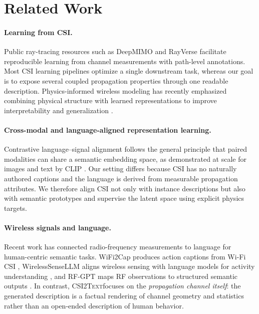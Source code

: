 \documentclass{article}
\newcommand{\model}{\textsc{CSI2Text}}
\begin{document}
\section{Related Work}

\paragraph{Learning from CSI.}
Public ray-tracing resources such as DeepMIMO \citep{alkhateeb2019deepmimo} and RayVerse \citep{rayverse2025} facilitate reproducible learning from channel measurements with path-level annotations.
Most CSI learning pipelines optimize a single downstream task, whereas our goal is to expose several coupled propagation properties through one readable description.
Physics-informed wireless modeling has recently emphasized combining physical structure with learned representations to improve interpretability and generalization \citep{zhu2024physicsinformed}.

\paragraph{Cross-modal and language-aligned representation learning.}
Contrastive language--signal alignment follows the general principle that paired modalities can share a semantic embedding space, as demonstrated at scale for images and text by CLIP \citep{radford2021clip}.
Our setting differs because CSI has no naturally authored captions and the language is derived from measurable propagation attributes.
We therefore align CSI not only with instance descriptions but also with semantic prototypes and supervise the latent space using explicit physics targets.

\paragraph{Wireless signals and language.}
Recent work has connected radio-frequency measurements to language for human-centric semantic tasks.
WiFi2Cap produces action captions from Wi-Fi CSI \citep{wei2026wifi2cap}, WirelessSenseLLM aligns wireless sensing with language models for activity understanding \citep{keya2026wirelesssensellm}, and RF-GPT maps RF observations to structured semantic outputs \citep{zou2026rfgpt}.
In contrast, \model focuses on the \emph{propagation channel itself}: the generated description is a factual rendering of channel geometry and statistics rather than an open-ended description of human behavior.
\end{document}
